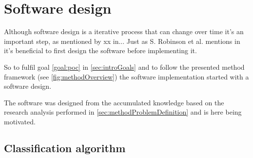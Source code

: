 \section{Software design}\label{sec:methodSoftwareDesign}
Although software design is a iterative process that can change over time it's  an important step, as mentioned by xx in...
Just as S. Robinson et al. mentions in \cite{SecretsSuccessfulSimulation1995} it's beneficial to first design the software before implementing it.
\bigskip

So to fulfil goal \ref{goal:poc} in \cref{sec:introGoals} and to follow the presented method framework (see \cref{fig:methodOverview}) the software implementation started with a software design.

\bigskip

The software was designed from the accumulated knowledge based on the research analysis performed in \cref{sec:methodProblemDefinition} and is here being motivated.

\subsection{Classification algorithm}\label{sec:methodSoftwareDesignClassification}


